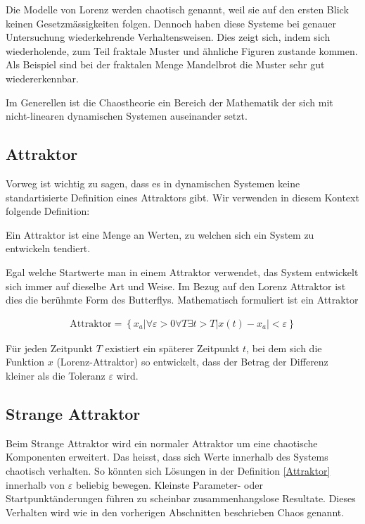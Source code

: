 Die Modelle von Lorenz werden chaotisch genannt, weil sie auf den ersten Blick keinen Gesetzmässigkeiten folgen. Dennoch haben diese Systeme bei genauer Untersuchung wiederkehrende Verhaltensweisen. Dies zeigt sich, indem sich wiederholende, zum Teil fraktale Muster und ähnliche Figuren zustande kommen. Als Beispiel sind bei der fraktalen Menge Mandelbrot die Muster sehr gut wiedererkennbar. 

Im Generellen ist die Chaostheorie ein Bereich der Mathematik der sich mit nicht-linearen dynamischen Systemen auseinander setzt.


\subsection{Attraktor}

Vorweg ist wichtig zu sagen, dass es in dynamischen Systemen keine standartisierte Definition eines Attraktors gibt. Wir verwenden in diesem Kontext folgende Definition: 
\begin{center}
	Ein Attraktor ist eine Menge an Werten, zu welchen sich ein System zu entwickeln tendiert.
\end{center} Egal welche Startwerte man in einem Attraktor verwendet, das System entwickelt sich immer auf dieselbe Art und Weise. Im Bezug auf den Lorenz Attraktor ist dies die berühmte Form des Butterflys. Mathematisch formuliert ist ein Attraktor 


\begin{align}%
\label{Attraktor} \text{Attraktor} = \left\{ x_a | \forall \varepsilon > 0
\forall T \exists t > T
|x(t) - x_a| < \varepsilon \right\} 
\end{align}

Für jeden Zeitpunkt $T$ existiert ein späterer Zeitpunkt $t$, bei dem sich die Funktion $x$ (Lorenz-Attraktor) so entwickelt, dass der Betrag der Differenz kleiner als die Toleranz $\varepsilon$ wird.

\subsection{Strange Attraktor}
Beim Strange Attraktor wird ein normaler Attraktor um eine chaotische Komponenten erweitert. Das heisst, dass sich Werte innerhalb des Systems chaotisch verhalten. So könnten sich Lösungen in der Definition \eqref{Attraktor} innerhalb von $\varepsilon$ beliebig bewegen. Kleinste Parameter- oder Startpunktänderungen führen zu scheinbar zusammenhangslose Resultate. Dieses Verhalten wird wie in den vorherigen Abschnitten beschrieben Chaos genannt.
